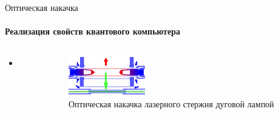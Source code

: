 \documentclass{beamer}
\begin{document}
    \begin{frame}{Оптическая накачка}
    \framesubtitle{Реализация свойств квантового компьютера}

    \begin{columns}

        \begin{column}{0.5\textwidth}

            \begin{itemize}
                \item 
            \end{itemize}

        \end{column}

        \begin{column}{0.5\textwidth}

            \begin{figure}
                \centering
                \includegraphics[width=0.35\textwidth]{media/optical-pumping.png}
                \caption{Оптическая накачка лазерного стержня дуговой лампой}
            \end{figure}

        \end{column}

        \end{columns}

    \end{frame}
\end{document}

